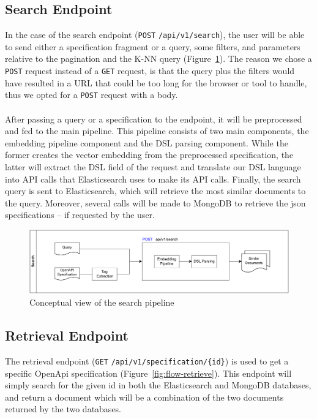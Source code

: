 \subsection{Search Endpoint}\label{subsec:search-endpoint-1}
In the case of the search endpoint (\verb|POST| \verb|/api/v1/search|), the user will be able to send either a specification fragment or a query, some filters, and parameters relative to the pagination and the K-NN query (Figure~\ref{fig:flow-search}).
The reason we chose a \verb|POST| request instead of a \verb|GET| request, is that the query plus the filters would have resulted in a URL that could be too long for the browser or tool to handle, thus we opted for a \verb|POST| request with a body. \\ \\
After passing a query or a specification to the endpoint, it will be preprocessed and fed to the main pipeline.
This pipeline consists of two main components, the embedding pipeline component and the DSL parsing component.
While the former creates the vector embedding from the preprocessed specification, the latter will extract the DSL field of the request and translate our DSL language into API calls that Elasticsearch uses to make its API calls.
Finally, the search query is sent to Elasticsearch, which will retrieve the most similar documents to the query.
Moreover, several calls will be made to MongoDB to retrieve the json specifications -- if requested by the user.

\begin{figure}[!h]
    \begin{center}
        \includegraphics[width=0.9\linewidth]{assets/pdf/architecture/flow-search}
    \end{center}

    \caption{Conceptual view of the search pipeline}
    \label{fig:flow-search}
\end{figure}

\subsection{Retrieval Endpoint}\label{subsec:retrieval-endpoint-1}
The retrieval endpoint (\verb|GET| \verb|/api/v1/specification/{id}|) is used to get a specific OpenApi specification (Figure~\ref{fig:flow-retrieve}).
This endpoint will simply search for the given id in both the Elasticsearch and MongoDB databases, and return a document which will be a combination of the two documents returned by the two databases.


